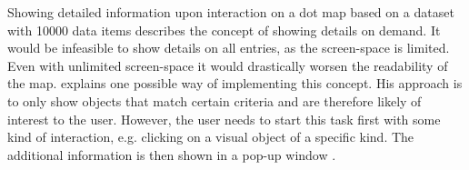 Showing detailed information upon interaction on a dot map based on a dataset with 10000 data items describes the concept of showing details on demand. It would be infeasible to show details on all entries, as the screen-space is limited. Even with unlimited screen-space it would drastically worsen the readability of the map. \citeauthor{Ahlberg:1996} explains one possible way of implementing this concept. His approach is to only show objects that match certain criteria and are therefore likely of interest to the user. However, the user needs to start this task first with some kind of interaction, e.g. clicking on a visual object of a specific kind. The additional information is then shown in a pop-up window .

